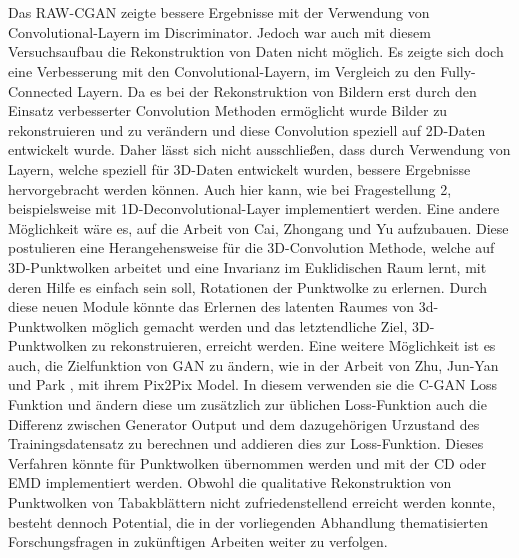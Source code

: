 \documentclass{llncs}
\begin{document}
\\\\
Das RAW-CGAN zeigte bessere Ergebnisse mit der Verwendung von Convolutional-Layern im Discriminator. Jedoch war auch mit diesem Versuchsaufbau die Rekonstruktion von Daten nicht möglich. Es zeigte sich doch eine Verbesserung mit den Convolutional-Layern, im Vergleich zu den Fully-Connected Layern. Da es bei der Rekonstruktion von Bildern erst durch den Einsatz verbesserter Convolution Methoden ermöglicht wurde Bilder zu rekonstruieren und zu verändern \cite{imagerecon} und diese Convolution speziell auf 2D-Daten entwickelt wurde. Daher lässt sich nicht ausschließen, dass durch Verwendung von Layern, welche speziell für 3D-Daten entwickelt wurden, bessere Ergebnisse hervorgebracht werden können. Auch hier kann, wie bei Fragestellung 2, beispielsweise mit 1D-Deconvolutional-Layer implementiert werden. Eine andere Möglichkeit wäre es, auf die Arbeit von Cai, Zhongang  und Yu \cite{3d-conv} aufzubauen. Diese postulieren eine Herangehensweise für die 3D-Convolution Methode, welche auf 3D-Punktwolken arbeitet und eine Invarianz im Euklidischen Raum lernt, mit deren Hilfe es einfach sein soll, Rotationen der Punktwolke zu erlernen. Durch diese neuen Module könnte das Erlernen des latenten Raumes von 3d-Punktwolken möglich gemacht werden und das letztendliche Ziel, 3D-Punktwolken zu rekonstruieren, erreicht werden.  Eine weitere Möglichkeit ist es auch, die Zielfunktion von GAN zu ändern, wie in der Arbeit von Zhu, Jun-Yan und Park \cite{pix2pix}, mit ihrem Pix2Pix Model. In diesem verwenden sie die C-GAN Loss Funktion und ändern diese um zusätzlich zur üblichen Loss-Funktion auch die Differenz zwischen Generator Output und dem dazugehörigen Urzustand des Trainingsdatensatz zu berechnen und addieren dies zur Loss-Funktion. Dieses Verfahren könnte für Punktwolken übernommen werden und mit der CD oder EMD implementiert werden. Obwohl die qualitative Rekonstruktion von Punktwolken von Tabakblättern nicht zufriedenstellend erreicht werden konnte, besteht dennoch Potential, die in der vorliegenden Abhandlung thematisierten Forschungsfragen in zukünftigen Arbeiten weiter zu verfolgen.
\newpage
\listoffigures
\newpage


\end{document}
